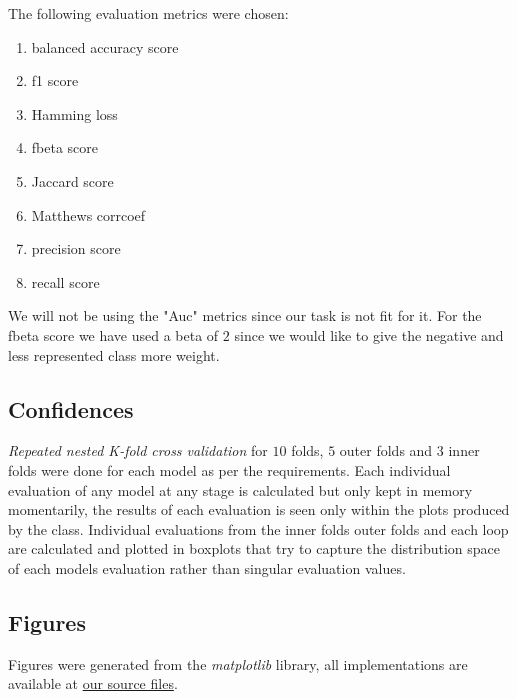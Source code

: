 \documentclass[12pt, a4paper]{article}
\begin{document}
\begin{multicols}{2}
    The following evaluation metrics were chosen:
    \newline

    \begin{enumerate} \label{enm:metrics}
        \item balanced accuracy score 
        \item f1 score
        \item Hamming loss
        \item fbeta score
        \item Jaccard score
        \item Matthews corrcoef
        \item precision score
        \item recall score
    \end{enumerate}

    We will not be using the "Auc" metrics since our task is not fit for it. For the fbeta score we have used a beta of $2$ since we would like to give the negative and less represented class more weight.
    \newline

    \subsection{Confidences} \label{subsec:conf}

    \textit{Repeated nested K-fold cross validation} for $10$ folds, $5$ outer folds and $3$ inner folds were done for each model as per the requirements. Each individual evaluation of any model at any stage is calculated but only kept in memory momentarily, the results of each evaluation is seen only within the plots produced by the class. Individual evaluations from the inner folds outer folds and each loop are calculated and plotted in boxplots that try to capture the distribution space of each models evaluation rather than singular evaluation values.
    \newline

    \subsection{Figures} \label{subsec:figs}

    Figures were generated from the \textit{matplotlib} \cite{noauthor_matplotlib_nodate} library, all implementations are available at \href{https://github.com/ArisPodotas/Assignment-2-MLICB}{our source files}.
    \newline


\end{multicols}
\end{document}
